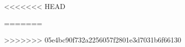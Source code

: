 <<<<<<< HEAD
\graphicspath{{figures/}}

=======
\graphicspath{{figure/}}

>>>>>>> 05e4bc90f732a2256057f2801e3d7031b6f66130
